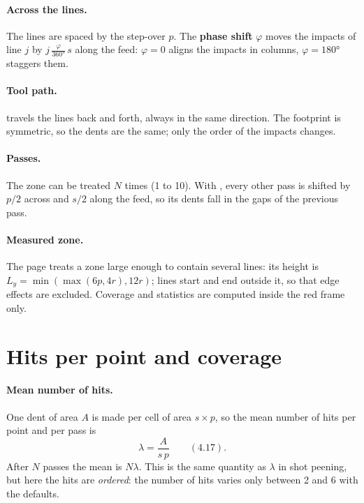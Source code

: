 \documentclass[11pt,a4paper]{article}
\begin{document}
\paragraph{Across the lines.} The lines are spaced by the step-over $p$. The \textbf{phase shift} $\varphi$ moves the impacts of line $j$ by $j\,\frac{\varphi}{360°}\,s$ along the feed: $\varphi=0$ aligns the impacts in columns, $\varphi=180°$ staggers them.

\paragraph{Tool path.}  travels the lines back and forth,  always in the same direction. The footprint is symmetric, so the dents are the same; only the order of the impacts changes.

\paragraph{Passes.} The zone can be treated $N$ times (1 to 10). With , every other pass is shifted by $p/2$ across and $s/2$ along the feed, so its dents fall in the gaps of the previous pass.

\paragraph{Measured zone.} The page treats a zone large enough to contain several lines: its height is $L_y=\min(\max(6p,4r),12r)$; lines start and end outside it, so that edge effects are excluded. Coverage and statistics are computed inside the red frame only.

\section{Hits per point and coverage}\label{sec:hits}

\paragraph{Mean number of hits.} One dent of area $A$ is made per cell of area $s\times p$, so the mean number of hits per point and per pass is
\begin{equation}
\lambda=\frac{A}{s\,p}\qquad(4.17).
\end{equation}
After $N$ passes the mean is $N\lambda$. This is the same quantity as $\lambda$ in shot peening, but here the hits are \emph{ordered}: the number of hits varies only between 2 and 6 with the defaults.
\end{document}
